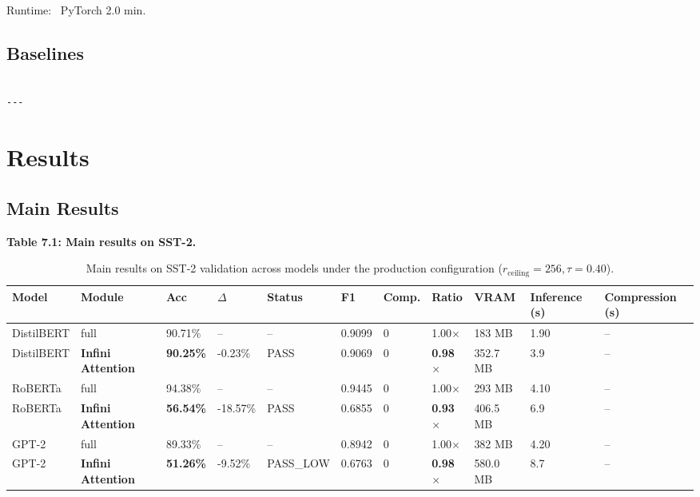 Runtime: ~PyTorch 2.0 min.

\subsection{Baselines}

\begin{lstlisting}

---
\end{lstlisting}


\section{Results}

\subsection{Main Results}

\textbf{Table 7.1: Main results on SST-2.}

\begin{table}[t]
\centering
\small
\begin{tabular}{lllllllllll}
\toprule
\textbf{Model} & \textbf{Module} & \textbf{Acc} & \textbf{$\Delta$} & \textbf{Status} & \textbf{F1} & \textbf{Comp.} & \textbf{Ratio} & \textbf{VRAM} & \textbf{Inference (s)} & \textbf{Compression (s)} \\
\midrule
DistilBERT & full & 90.71\% & -- & -- & 0.9099 & 0 & 1.00$\times$ & 183 MB & 1.90 & -- \\
DistilBERT & \textbf{Infini Attention} & \textbf{90.25\%} & -0.23\% & PASS & 0.9069 & 0 & \textbf{0.98$\times$} & 352.7 MB & 3.9 & -- \\
RoBERTa & full & 94.38\% & -- & -- & 0.9445 & 0 & 1.00$\times$ & 293 MB & 4.10 & -- \\
RoBERTa & \textbf{Infini Attention} & \textbf{56.54\%} & -18.57\% & PASS & 0.6855 & 0 & \textbf{0.93$\times$} & 406.5 MB & 6.9 & -- \\
GPT-2 & full & 89.33\% & -- & -- & 0.8942 & 0 & 1.00$\times$ & 382 MB & 4.20 & -- \\
GPT-2 & \textbf{Infini Attention} & \textbf{51.26\%} & -9.52\% & PASS\_LOW & 0.6763 & 0 & \textbf{0.98$\times$} & 580.0 MB & 8.7 & -- \\
\bottomrule
\end{tabular}
\caption{Main results on SST-2 validation across models under the production configuration ($r_{\mathrm{ceiling}}=256, \tau=0.40$).}
\label{tab:main_sst2}
\end{table}

